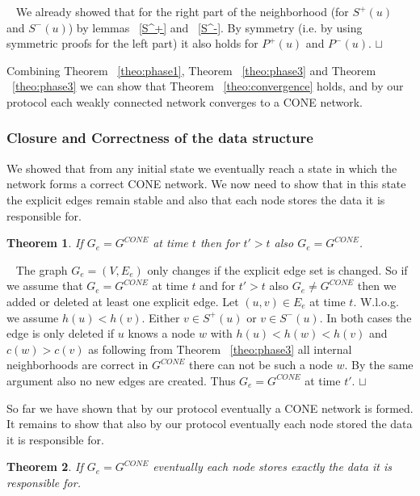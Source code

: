 \documentclass[11pt]{article}
\newtheorem{theorem}{Theorem}[section]
\newcommand{\sq}{\hbox{\rlap{$\sqcap$}$\sqcup$}}
\newcommand{\qed}{\hspace*{\fill}\sq}
\newenvironment{proof}{\noindent {\bf Proof.}\ }{\qed\par\vskip 4mm\par}
\begin{document}
\begin{proof}
We already showed that for the right part of the neighborhood (for $S^+(u)$ and $S^-(u)$) by lemmas ~\ref{S^+} and ~\ref{S^-}.
By symmetry (i.e. by using symmetric proofs for the left part) it also holds for $P^+(u)$ and $P^-(u)$.
\end{proof}



Combining Theorem ~\ref{theo:phase1}, Theorem ~\ref{theo:phase3} and Theorem ~\ref{theo:phase3} we can show that Theorem ~\ref{theo:convergence} holds, and by our protocol each weakly connected network converges to a CONE network.

\subsubsection{Closure and Correctness of the data structure}

We showed that from any initial state we eventually reach a state in which the network forms a correct CONE network. We now need to show that in this state the explicit edges remain stable and also that each node stores the data it is responsible for.

\begin{theorem}\label{theo:closure}
If $G_e=G^{CONE}$ at time $t$ then for $t'>t$ also $G_e=G^{CONE}$.
\end{theorem}

\begin{proof}
The graph $G_e=(V,E_e)$ only changes if the explicit edge set is changed. So if we assume that $G_e=G^{CONE}$ at time $t$ and for $t'>t$ also $G_e\neq G^{CONE}$ then we added or deleted at least one explicit edge. Let $(u,v)\in E_e$ at time $t$. W.l.o.g. we assume $h(u)<h(v)$. Either $v \in S^+(u)$ or $v\in S^-(u)$. In both cases the edge is only deleted if $u$ knows a node $w$ with $h(u)<h(w)<h(v)$ and $c(w)>c(v)$ as following from Theorem ~\ref{theo:phase3} all internal neighborhoods are correct in $G^{CONE}$ there can not be such a node $w$. By the same argument also no new edges are created. Thus $G_e=G^{CONE}$ at time $t'$.
\end{proof}

So far we have shown that by our protocol eventually a CONE network is formed. It remains to show that also by our protocol eventually each node stored the data it is responsible for.

\begin{theorem}\label{theo:datastructure}
If $G_e=G^{CONE}$ eventually each node stores exactly the data it is responsible for.
\end{theorem}
\end{document}

